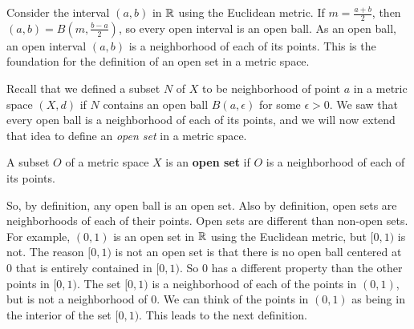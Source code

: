 \label{sec:open_sets}


\vspace*{-17 pt}

\vspace*{13 pt}


Consider the interval $(a,b)$ in $\mathbb{R}$ using the Euclidean metric. If $m = \frac{a+b}{2}$, then $(a,b) = B\left(m,\frac{b-a}{2}\right)$, so every open interval is an open ball. As an open ball, an open interval $(a,b)$ is a neighborhood of each of its points. This is the foundation for the definition of an open set in a metric space. 

Recall that we defined a subset $N$ of $X$ to be neighborhood of point $a$ in a metric space $(X,d)$ if $N$ contains an open ball $B(a, \epsilon)$ for some $\epsilon > 0$. We saw that every open ball is a neighborhood of each of its points, and we will now extend that idea to define an \emph{open set} in a metric space.

\begin{definition} A subset $O$ of a metric space $X$ is an \textbf{open set} if $O$ is a neighborhood of each of its points.
\end{definition}

So, by definition, any open ball is an open set. Also by definition, open sets are neighborhoods of each of their points. Open sets are different than non-open sets. For example, $(0,1)$ is an open set in $\mathbb{R}$ using the Euclidean metric, but $[0,1)$ is not. The reason $[0,1)$ is not an open set is that there is no open ball centered at $0$ that is entirely contained in $[0,1)$. So $0$ has a different property than the other points in $[0,1)$. The set $[0,1)$ is a neighborhood of each of the points in $(0,1)$, but is not a neighborhood of $0$. We can think of the points in $(0,1)$ as being in the interior of the set $[0,1)$. This leads to the next definition. 


